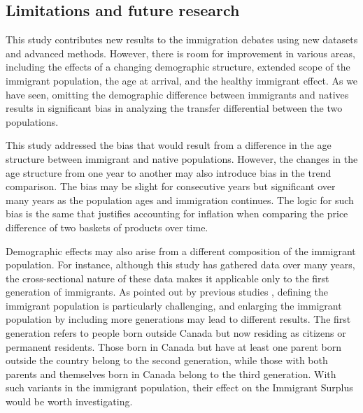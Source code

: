 \subsection{Limitations and future research}
This study contributes new results to the immigration debates using new datasets and advanced methods.
However, there is room for improvement in various areas, including the effects of a changing demographic structure, extended scope of the immigrant population, the age at arrival, and the healthy immigrant effect.
As we have seen, omitting the demographic difference between immigrants and natives results in significant bias in analyzing the transfer differential between the two populations.

\vspace{0.7em}\par
This study addressed the bias that would result from a difference in the age structure between immigrant and native populations. However, the changes in the age structure from one year to another may also introduce bias in the trend comparison. The bias may be slight for consecutive years but significant over many years as the population ages and immigration continues.
The logic for such bias is the same that justifies accounting for inflation when comparing the price difference of two baskets of products over time.

\vspace{0.7em}\par
Demographic effects may also arise from a different composition of the immigrant population.
For instance, although this study has gathered data over many years, the cross-sectional nature of these data makes it applicable only to the first generation of immigrants.
As pointed out by previous studies \citep{Lee:1998fs}, defining the immigrant population is particularly challenging, and enlarging the immigrant population by including more generations may lead to different results.
The first generation refers to people born outside Canada but now residing as citizens or permanent residents.
Those born in Canada but have at least one parent born outside the country belong to the second generation, while those with both parents and themselves born in Canada belong to the third generation.
With such variants in the immigrant population, their effect on the Immigrant Surplus would be worth investigating.

